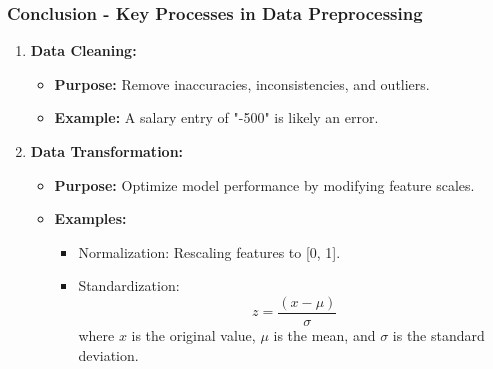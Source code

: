 \documentclass[aspectratio=169]{beamer}
\begin{document}
\begin{frame}[fragile]
    \frametitle{Conclusion - Key Processes in Data Preprocessing}
    \begin{enumerate}
        \item \textbf{Data Cleaning:}
        \begin{itemize}
            \item \textbf{Purpose:} Remove inaccuracies, inconsistencies, and outliers.
            \item \textbf{Example:} A salary entry of "-500" is likely an error.
        \end{itemize}
        
        \item \textbf{Data Transformation:}
        \begin{itemize}
            \item \textbf{Purpose:} Optimize model performance by modifying feature scales.
            \item \textbf{Examples:}
            \begin{itemize}
                \item Normalization: Rescaling features to [0, 1].
                \item Standardization:
                \begin{equation}
                    z = \frac{(x - \mu)}{\sigma}
                \end{equation}
                where $x$ is the original value, $\mu$ is the mean, and $\sigma$ is the standard deviation.
            \end{itemize}
        \end{itemize}
    \end{enumerate}
\end{frame}
\end{document}
